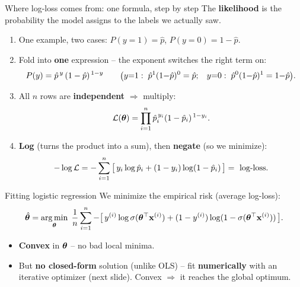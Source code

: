 \documentclass[aspectratio=169]{beamer}
\begin{document}
\begin{frame}{Where log-loss comes from: one formula, step by step}
  \small
  The \textbf{likelihood} is the probability the model assigns to the labels we actually saw.
  \begin{enumerate}\small
    \item One example, two cases: \quad $P(y{=}1)=\hat p$, \qquad $P(y{=}0)=1-\hat p$.
    \item Fold into \textbf{one} expression -- the exponent switches the right term on:
      \[ P(y)=\hat p^{\,y}\,(1-\hat p)^{\,1-y}
         \qquad {\footnotesize \big(y{=}1:\ \hat p^1(1{-}\hat p)^0=\hat p;\quad y{=}0:\ \hat p^0(1{-}\hat p)^1=1{-}\hat p\big).} \]
    \item All $n$ rows are \textbf{independent} $\Rightarrow$ multiply:
      \[ \mathcal{L}(\bm{\theta})=\prod_{i=1}^{n}\hat p_i^{\,y_i}(1-\hat p_i)^{\,1-y_i}. \]
    \item \textbf{Log} (turns the product into a sum), then \textbf{negate} (so we minimize):
      \[ -\log\mathcal{L}=-\sum_{i=1}^{n}\big[\,y_i\log\hat p_i+(1-y_i)\log(1-\hat p_i)\,\big]=\ \text{log-loss}. \]
  \end{enumerate}
  \vskip 1pt
\end{frame}

\begin{frame}{Fitting logistic regression}
  We minimize the empirical risk (average log-loss):
  \[
    \hat{\bm{\theta}} = \mathop{\mathrm{arg\,min}}_{\bm{\theta}} \; \frac1n \sum_{i=1}^{n} -\big[\,y^{(i)} \log \sigma(\bm{\theta}^\top \mathbf{x}^{(i)}) + (1-y^{(i)})\log(1-\sigma(\bm{\theta}^\top \mathbf{x}^{(i)}))\,\big].
  \]
  \begin{itemize}
    \item \textbf{Convex} in $\bm{\theta}$ -- no bad local minima.
    \item But \textbf{no closed-form} solution (unlike OLS) -- fit \textbf{numerically}
      with an iterative optimizer (next slide). Convex $\Rightarrow$ it reaches the
      global optimum.
  \end{itemize}
  \vfill
\end{frame}
\end{document}
